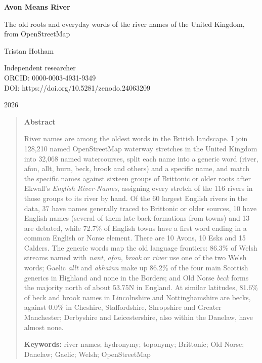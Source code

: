 \documentclass[11pt,a4paper]{article}
\begin{document}
\begin{center}
{\Large\bfseries Avon Means River\par}
\vspace{0.4em}
{\large The old roots and everyday words of the river names of the United Kingdom, from OpenStreetMap\par}
\vspace{1.2em}
{\large Tristan Hotham\par}
\vspace{0.3em}
{\small Independent researcher\\
ORCID: 0000-0003-4931-9349\\
DOI: https://doi.org/10.5281/zenodo.24063209\par}
\vspace{0.8em}
2026
\end{center}

\begin{quote}
\small
\begin{center}\textbf{Abstract}\end{center}
River names are among the oldest words in the British landscape. I join 128,210 named OpenStreetMap waterway stretches in the United Kingdom into 32,068 named watercourses, split each name into a generic word (river, afon, allt, burn, beck, brook and others) and a specific name, and match the specific names against sixteen groups of Brittonic or older roots after Ekwall's \textit{English River-Names}, assigning every stretch of the 116 rivers in those groups to its river by hand. Of the 60 largest English rivers in the data, 37 have names generally traced to Brittonic or older sources, 10 have English names (several of them late back-formations from towns) and 13 are debated, while 72.7\% of English towns have a first word ending in a common English or Norse element. There are 10 Avons, 10 Esks and 15 Calders. The generic words map the old language frontiers: 86.3\% of Welsh streams named with \textit{nant}, \textit{afon}, \textit{brook} or \textit{river} use one of the two Welsh words; Gaelic \textit{allt} and \textit{abhainn} make up 86.2\% of the four main Scottish generics in Highland and none in the Borders; and Old Norse \textit{beck} forms the majority north of about 53.75\textdegree{}N in England. At similar latitudes, 81.6\% of beck and brook names in Lincolnshire and Nottinghamshire are becks, against 0.0\% in Cheshire, Staffordshire, Shropshire and Greater Manchester; Derbyshire and Leicestershire, also within the Danelaw, have almost none.

\textbf{Keywords:} river names; hydronymy; toponymy; Brittonic; Old Norse; Danelaw; Gaelic; Welsh; OpenStreetMap
\end{quote}
\end{document}
